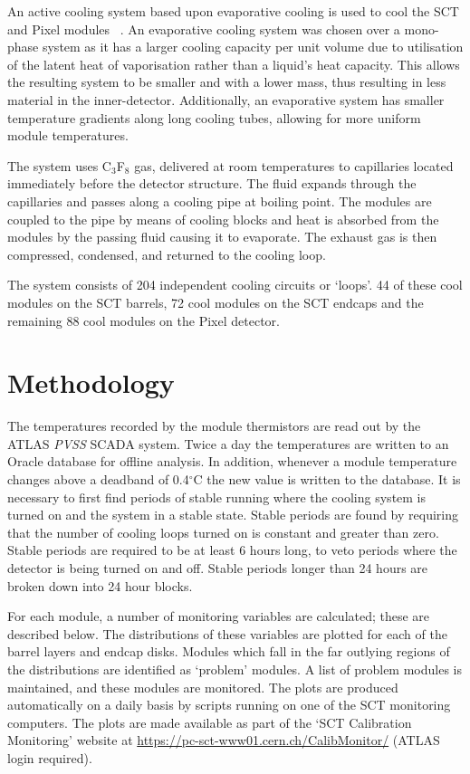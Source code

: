 An active cooling system based upon
evaporative cooling is used to cool the SCT and Pixel modules ~\cite{1748-0221-3-07-P07003}. An
evaporative cooling system was chosen over a mono-phase system as it has a
larger cooling capacity per unit volume due to utilisation of the latent heat of
vaporisation rather than a liquid's heat capacity. This allows the resulting
system to be smaller and with a lower mass, thus resulting in less material in
the inner-detector. Additionally, an evaporative system has
smaller temperature gradients along long cooling tubes, allowing for more
uniform module temperatures.

The system uses C$_3$F$_8$ gas, delivered at room temperatures to capillaries
located immediately before the detector structure. The fluid expands through the
capillaries and passes along a cooling pipe at boiling point. The modules are
coupled to the pipe by means of cooling blocks and heat is absorbed from the
modules by the passing fluid causing it to evaporate. The exhaust gas is then
compressed, condensed, and returned to the cooling loop.

The system consists of 204 independent cooling circuits or `loops'. 44 of these
cool modules on the SCT barrels, 72 cool modules on the SCT endcaps and the
remaining 88 cool modules on the Pixel detector.

\section{Methodology}
The temperatures recorded by the module thermistors are read out by the ATLAS
\textit{PVSS} SCADA system. Twice a day the temperatures are written to an
Oracle database for offline analysis. In addition, whenever a module temperature changes above a deadband of 0.4$^\circ$C the new value is written to the database.
It is necessary to first find periods of stable running where the cooling system is turned on and the system in a stable state. Stable periods are found by requiring that the number of cooling loops turned on is constant and greater than zero. Stable periods are required to be at least 6 hours long, to veto periods where the detector is being turned on and off. Stable periods longer than 24 hours are broken down into 24 hour blocks.

For each module, a number of monitoring variables are calculated; these are described below. The distributions of these variables are plotted for each of the barrel layers and endcap disks. Modules which fall in the far outlying regions of the distributions are identified as `problem' modules. A list of problem modules is maintained, and these modules are monitored. The plots are produced automatically on a daily basis by scripts running on one of the SCT monitoring computers. The plots are made available as part of the `SCT Calibration Monitoring' website at \url{https://pc-sct-www01.cern.ch/CalibMonitor/} (ATLAS login required).

